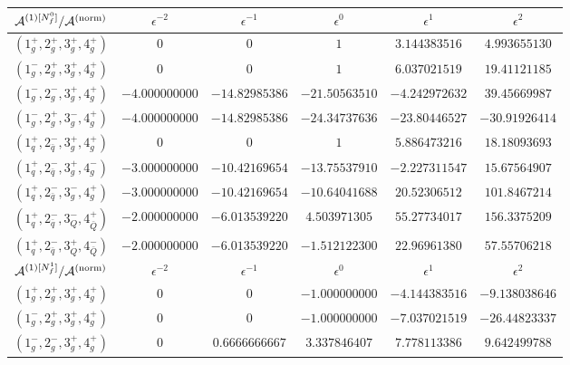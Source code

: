 \begin{table}[h]
  \centering
  \begin{adjustbox}{width=1\textwidth}
    \begin{tabular}{cccccc}
      \toprule
      $\mathcal{A}^{(1)[N_f^0]}/\mathcal{A}^\mathrm{(norm)}$   &   $\epsilon^{-2}$   &   $\epsilon^{-1}$   &   $\epsilon^{0}$   &   $\epsilon^{1}$  &  $\epsilon^{2}$ \\
      \midrule
      $(1_g^+,2_g^+,3_g^+,4_g^+)$ & $0$ & $0$ & $1$ & 
      $3.144383516$
      & $4.993655130$ \\
      $(1_g^-,2_g^+,3_g^+,4_g^+)$ & $0$ & $0$ & $1$ & 
      $6.037021519$
      & $19.41121185$ \\
      $(1_g^-,2_g^-,3_g^+,4_g^+)$ &  $-4.000000000$ &
      $-14.82985386$ &
      $-21.50563510$ & $-4.242972632$ & $39.45669987$ \\
      $(1_g^-,2_g^+,3_g^-,4_g^+)$ &  $-4.000000000$ &
      $-14.82985386$ & $-24.34737636$ & $-23.80446527$ &
      $-30.91926414$\\ \midrule
      $(1_q^+,2_{\bar q}^-,3_g^+,4_g^+)$ & $0$ & $0$ & $1$ &
      $5.886473216$  & $18.18093693$   \\
      $(1_q^+,2_{\bar q}^-,3_g^+,4_g^-)$ & $-3.000000000$ &
      $-10.42169654$ & $-13.75537910$ & $-2.227311547$ &
      $15.67564907$ \\
      $(1_q^+,2_{\bar q}^-,3_g^-,4_g^+)$ & $-3.000000000$ &
      $-10.42169654$ &
      $-10.64041688$ & $20.52306512$ & $101.8467214$ \\
      \midrule
      $(1_q^+,2_{\bar q}^-,3_Q^-,4_{\bar Q}^+)$ & $-2.000000000$ &
      $-6.013539220$  & $4.503971305$ & $55.27734017$ &
      $156.3375209$ \\
      $(1_q^+,2_{\bar q}^-,3_Q^+,4_{\bar Q}^-)$ & $-2.000000000$ &
      $-6.013539220$  & $-1.512122300$ & $22.96961380$ &
      $57.55706218$ \\
      \toprule
      $\mathcal{A}^{(1)[N_f^1]}/\mathcal{A}^\mathrm{(norm)}$   &   $\epsilon^{-2}$   &   $\epsilon^{-1}$   &   $\epsilon^{0}$   &   $\epsilon^{1}$  &  $\epsilon^{2}$ \\
      \midrule
      $(1_g^+,2_g^+,3_g^+,4_g^+)$ & $0$ & $0$ & $-1.000000000$ &
      $-4.144383516$ & $-9.138038646$\\
      $(1_g^-,2_g^+,3_g^+,4_g^+)$ & $0$ & $0$ & $-1.000000000$ &
      $-7.037021519$ & $-26.44823337$ \\
      $(1_g^-,2_g^-,3_g^+,4_g^+)$ & $0$ & $0.6666666667$ &
      $3.337846407$ & $7.778113386$ & $9.642499788$ \\

\end{tabular}
\end{adjustbox}
\end{table}
